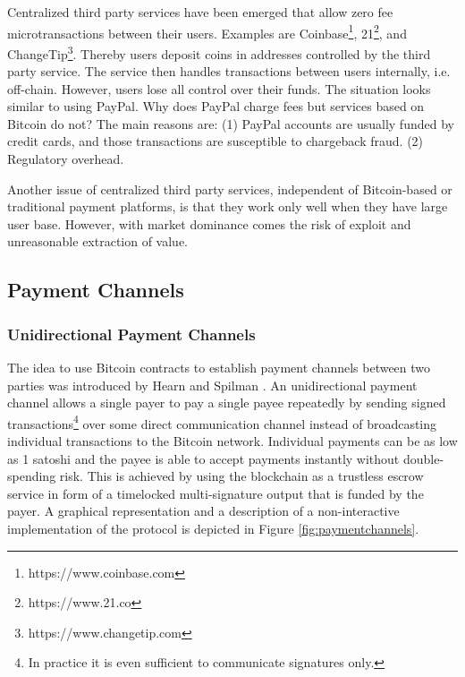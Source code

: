 Centralized third party services have been emerged that allow zero fee microtransactions between their users. Examples are Coinbase\footnote{https://www.coinbase.com}, 21\footnote{https://www.21.co}, and ChangeTip\footnote{https://www.changetip.com}. Thereby users deposit coins in addresses controlled by the third party service. The service then handles transactions between users internally, i.e. off-chain. However, users lose all control over their funds. The situation looks similar to using PayPal. Why does PayPal charge fees but services based on Bitcoin do not? The main reasons are: (1) PayPal accounts are usually funded by credit cards, and those transactions are susceptible to chargeback fraud. (2) Regulatory overhead. 

Another issue of centralized third party services, independent of Bitcoin-based or traditional payment platforms, is that they work only well when they have large user base. However, with market dominance comes the risk of exploit and unreasonable extraction of value. 

\subsection{Payment Channels}

\subsubsection{Unidirectional Payment Channels}
\label{sec:unipc}

The idea to use Bitcoin contracts to establish payment channels between two parties was introduced by Hearn and Spilman \parencite{Hearn2013,Spilman2013}. An unidirectional payment channel allows a single payer to pay a single payee repeatedly by sending signed transactions\footnote{In practice it is even sufficient to communicate signatures only.} over some direct communication channel instead of broadcasting individual transactions to the Bitcoin network. Individual payments can be as low as 1 satoshi and the payee is able to accept payments instantly without double-spending risk. This is achieved by using the blockchain as a trustless escrow service in form of a timelocked multi-signature output that is funded by the payer. A graphical representation and a description of a non-interactive implementation of the protocol is depicted in Figure \ref{fig:paymentchannels}.

